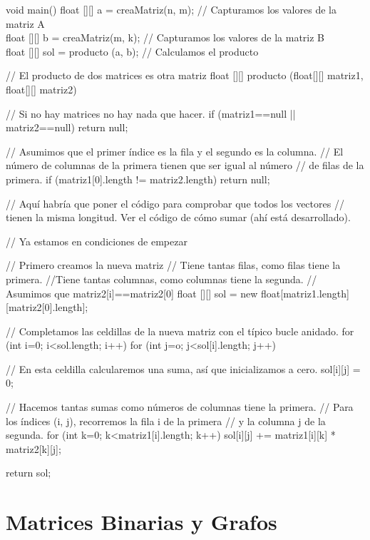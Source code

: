 \begin{code}[caption=Suma de Matrices, label=default]
void main() {
  float [][] a = creaMatriz(n, m); // Capturamos los valores de la matriz A \\
  float [][] b = creaMatriz(m, k); // Capturamos los valores de la matriz B \\
  float [][] sol = producto (a, b);  // Calculamos el producto \\
} 

// El producto de dos matrices es otra matriz
float [][] producto (float[][] matriz1, float[][] matriz2) {
   // Si no hay matrices no hay nada que hacer.
   if (matriz1==null || matriz2==null) return null;
   
   // Asumimos que el primer índice es la fila y el segundo es la columna.
   // El número de columnas de la primera tienen que ser igual al número
   // de filas de la primera.
   if (matriz1[0].length != matriz2.length) return null;
   
   // Aquí habría que poner el código para comprobar que todos los vectores
   // tienen la misma longitud. Ver el código de cómo sumar (ahí está desarrollado).
   
   // Ya estamos en condiciones de empezar
   
   // Primero creamos la nueva matriz
   // Tiene tantas filas, como filas tiene la primera.
   //Tiene tantas columnas, como columnas tiene la segunda.
   // Asumimos que matriz2[i]==matriz2[0]
   float [][] sol = new float[matriz1.length][matriz2[0].length];
   
   // Completamos las celdillas de la nueva matriz con el típico bucle anidado.
   for (int i=0; i<sol.length; i++)
     for (int j=o; j<sol[i].length; j++) {
       // En esta celdilla calcularemos una suma, así que inicializamos a cero.
       sol[i][j] = 0;
       
       // Hacemos tantas sumas como números de columnas tiene la primera.
       // Para los índices (i, j), recorremos la fila i de la primera
       // y la columna j de la segunda.
       for (int k=0; k<matriz1[i].length; k++) {
         sol[i][j] += matriz1[i][k] * matriz2[k][j];
       }
     }
     
   return sol;
}    
\end{code}

\section{Matrices Binarias y Grafos} 


